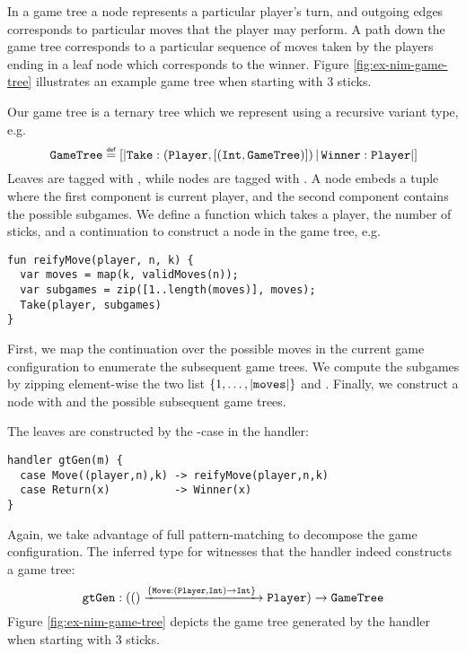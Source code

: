 \begin{example}\label{ex:nim-game-tree}
In a game tree a node represents a particular player's turn, and outgoing edges corresponds to particular moves that the player may perform. A path down the game tree corresponds to a particular sequence of moves taken by the players ending in a leaf node which corresponds to the winner. Figure \ref{fig:ex-nim-game-tree} illustrates an example game tree when starting with 3 sticks.

Our game tree is a ternary tree which we represent using a recursive variant type, e.g.
\[ \type{GameTree} \defas [|\type{Take}:(\type{Player},[(\type{Int},\type{GameTree})])\,|\,\type{Winner}:\type{Player}|] \]
Leaves are tagged with , while nodes are tagged with . A  node embeds a tuple where the first component is current player, and the second component contains the possible subgames.
We define a function  which takes a player, the number of sticks, and a continuation to construct a node in the game tree, e.g.
\begin{lstlisting}[style=links]
fun reifyMove(player, n, k) {
  var moves = map(k, validMoves(n));
  var subgames = zip([1..length(moves)], moves);
  Take(player, subgames)
}
\end{lstlisting}
First, we map the continuation over the possible moves in the current game configuration to enumerate the subsequent game trees. We compute the subgames by zipping element-wise the two list $\{1,\dots,|\code{moves}|\}$ and . Finally, we construct a node  with  and the possible subsequent game trees.

The leaves are constructed by the -case in the handler:
\begin{lstlisting}[style=links]
handler gtGen(m) {
  case Move((player,n),k) -> reifyMove(player,n,k)
  case Return(x)          -> Winner(x)
}
\end{lstlisting}
Again, we take advantage of full pattern-matching to decompose the game configuration. The inferred type for  witnesses that the handler indeed constructs a game tree:
\[ \code{gtGen} : (() \xrightarrow{\{\type{Move}:(\type{Player},\type{Int}) \to \type{Int}\}\;} \type{Player}) \to \type{GameTree} \]
Figure \ref{fig:ex-nim-game-tree} depicts the game tree generated by the handler when starting with 3 sticks.
\begin{figure}[H]
\begin{center}
\begin{tikzpicture}[level distance=1.5cm,
level 1/.style={sibling distance=3.5cm},
level 2/.style={sibling distance=2cm}]


\end{tikzpicture}
\end{center}
\end{figure}
\end{example}

